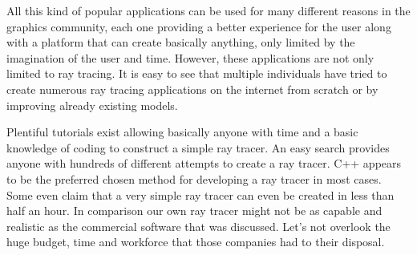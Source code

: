 \documentclass[10pt]{scrartcl}
\begin{document}
All this kind of popular applications can be used for many different reasons in the graphics community, each one providing a better experience for the user along with a platform that can create basically anything, only limited by the imagination of the user and time. However, these applications are not only limited to ray tracing. It is easy to see that multiple individuals have tried to create numerous ray tracing applications on the internet from scratch or by improving already existing models.\par
Plentiful tutorials exist allowing basically anyone with time and a basic knowledge of coding to construct a simple ray tracer. An easy search provides anyone with hundreds of different attempts to create a ray tracer. C++ appears to be the preferred chosen method for developing a ray tracer in most cases. Some even claim that a very simple ray tracer can even be created in less than half an hour.
In comparison our own ray tracer might not be as capable and realistic as the commercial software that was discussed. Let’s not overlook the huge budget, time and workforce that those companies had to their disposal.  \par
\end{document}

